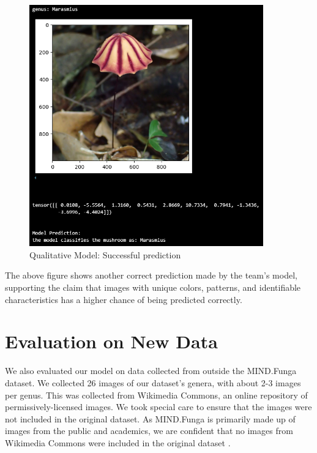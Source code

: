 \documentclass{article} %
\begin{document}
\FloatBarrier
\begin{figure}[h]
    \begin{center}
    \includegraphics[width=0.9\textwidth]{figures/qualitativeResultImg3.png}
    \end{center}
    \caption{Qualitative Model: Successful prediction}
    \label{fig:goodPrediction2}
\end{figure}
\FloatBarrier

The above figure shows another correct prediction made by the team’s model, supporting the claim that images with unique colors, patterns, and identifiable characteristics has a higher chance of being predicted correctly.

\section{Evaluation on New Data}
\label{sec:evaluation}
We also evaluated our model on data collected from outside the MIND.Funga dataset. We collected 26 images of our dataset's genera, with about 2-3 images per genus. This was collected from Wikimedia Commons, an online repository of permissively-licensed images. We took special care to ensure that the images were not included in the original dataset. As MIND.Funga is primarily made up of images from the public and academics, we are confident that no images from Wikimedia Commons were included in the original dataset \citep{Drechsler-SantosKarstedtEtAl.MINDFunga.2023}.
\end{document}
